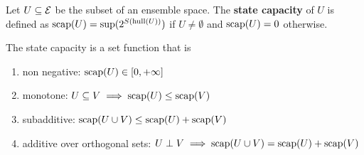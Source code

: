 \begin{defn}
	Let $U \subseteq \mathcal{E}$ be the subset of an ensemble space. The \textbf{state capacity} of $U$ is defined as $\mathrm{scap}(U) = \sup(2^{S(\mathrm{hull}(U))})$ if $U \neq \emptyset$ and $\mathrm{scap}(U) = 0$ otherwise.
\end{defn}

\begin{prop}
	The state capacity is a set function that is
	\begin{enumerate}
		\item non negative: $\mathrm{scap}(U) \in [0, +\infty]$
		\item monotone: $U \subseteq V \implies \mathrm{scap}(U) \leq \mathrm{scap}(V)$
		\item subadditive: $\mathrm{scap}(U \cup V) \leq \mathrm{scap}(U) + \mathrm{scap}(V)$
		\item additive over orthogonal sets: $U \perp V \implies \mathrm{scap}(U \cup V) = \mathrm{scap}(U) + \mathrm{scap}(V)$ 
	\end{enumerate}
\end{prop}

